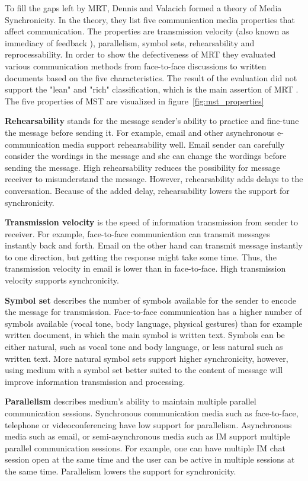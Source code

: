 \documentclass[english,12pt,a4paper,pdftex]{article}
\begin{document}
To fill the gaps left by \ac{MRT}, Dennis and Valacich formed a theory of Media Synchronicity. In the theory, they list five communication media properties that affect communication. The properties are transmission velocity (also known as immediacy of feedback \citep{dennis1999}), parallelism, symbol sets, rehearsability and reprocessability. In order to show the defectiveness of \ac{MRT} they evaluated various communication methods from face-to-face discussions to written documents based on the five characteristics. The result of the evaluation did not support the "lean" and "rich" classification, which is the main assertion of \ac{MRT} \citep{dennis2008}. The five properties of \ac{MST} are visualized in figure~\ref{fig:mst_properties}

\textbf{Rehearsability} stands for the message sender's ability to practice and fine-tune the message before sending it. For example, email and other asynchronous e-communication media support rehearsability well. Email sender can carefully consider the wordings in the message and she can change the wordings before sending the message. High rehearsability reduces the possibility for message receiver to misunderstand the message. However, rehearsability adds delays to the conversation. Because of the added delay, rehearsability lowers the support for synchronicity.

\textbf{Transmission velocity} is the speed of information transmission from sender to receiver. For example, face-to-face communication can transmit messages instantly back and forth. Email on the other hand can transmit message instantly to one direction, but getting the response might take some time. Thus, the transmission velocity in email is lower than in face-to-face. High transmission velocity supports synchronicity.

\textbf{Symbol set} describes the number of symbols available for the sender to encode the message for transmission. Face-to-face communication has a higher number of symbols available (vocal tone, body language, physical gestures) than for example written document, in which the main symbol is written text. Symbols can be either natural, such as vocal tone and body language, or less natural such as written text. More natural symbol sets support higher synchronicity, however, using medium with a symbol set better suited to the content of message will improve information transmission and processing.

\textbf{Parallelism} describes medium's ability to maintain multiple parallel communication sessions. Synchronous communication media such as face-to-face, telephone or videoconferencing have low support for parallelism. Asynchronous media such as email, or semi-asynchronous media such as \ac{IM} support multiple parallel communication sessions. For example, one can have multiple \ac{IM} chat session open at the same time and the user can be active in multiple sessions at the same time. Parallelism lowers the support for synchronicity.
\end{document}

